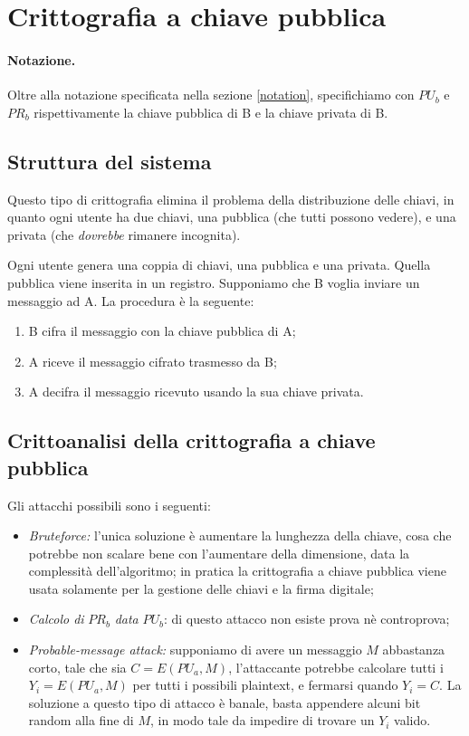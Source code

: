\documentclass[a4paper, 10pt, twoside]{article}
\newcommand{\pua}{PU_a}
\begin{document}
	\section{Crittografia a chiave pubblica}
	\paragraph{Notazione.} Oltre alla notazione specificata nella sezione \ref{notation}, specifichiamo con $PU_b$ e $PR_b$ rispettivamente la chiave pubblica di B e la chiave privata di B.
	
	\subsection{Struttura del sistema}
	Questo tipo di crittografia elimina il problema della distribuzione delle chiavi, in quanto ogni utente ha due chiavi, una pubblica (che tutti possono vedere), e una privata (che \textit{dovrebbe} rimanere incognita).
	
	Ogni utente genera una coppia di chiavi, una pubblica e una privata. Quella pubblica viene inserita in un registro.
	Supponiamo che B voglia inviare un messaggio ad A. La procedura è la seguente:\begin{enumerate}
		\item B cifra il messaggio con la chiave pubblica di A;
		\item A riceve il messaggio cifrato trasmesso da B;
		\item A decifra il messaggio ricevuto usando la sua chiave privata.
	\end{enumerate}

	\subsection{Crittoanalisi della crittografia a chiave pubblica}
	Gli attacchi possibili sono i seguenti: \begin{itemize}
		\item \textit{Bruteforce:} l'unica soluzione è aumentare la lunghezza della chiave, cosa che potrebbe non scalare bene con l'aumentare della dimensione, data la complessità dell'algoritmo; in pratica la crittografia a chiave pubblica viene usata solamente per la gestione delle chiavi e la firma digitale;
		
		\item \textit{Calcolo di} $PR_b$ \textit{data} $PU_b$: di questo attacco non esiste prova nè controprova;
		
		\item \textit{Probable-message attack:} supponiamo di avere un messaggio $M$ abbastanza corto, tale che sia $C = E(\pua, M) $, l'attaccante potrebbe calcolare tutti i $Y_i = E(\pua, M)$ per tutti i possibili plaintext, e fermarsi quando $Y_i = C$. La  soluzione a questo tipo di attacco è banale, basta appendere alcuni bit random alla fine di $M$, in modo tale da impedire di trovare un $Y_i$ valido.
	\end{itemize}
\end{document}
